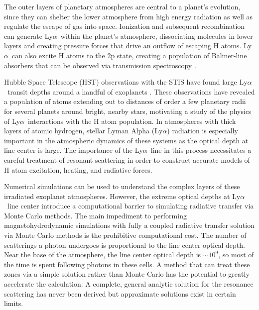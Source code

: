 \documentclass{aastex63}
\newcommand\lya{Ly$\alpha$\ }
\begin{document}
The outer layers of planetary atmospheres are central to a planet's evolution, since they can shelter the lower atmosphere from high energy radiation as well as regulate the escape of gas into space. Ionization and subsequent recombination can generate \lya within the planet's atmosphere, dissociating molecules in lower layers and creating pressure forces that drive an outflow of escaping H atoms. \lya can also excite H atoms to the 2p state, creating a population of Balmer-line absorbers that can be observed via transmission spectroscopy \citep{2017ApJ...851..150H}.

Hubble Space Telescope (HST) observations with the STIS have found large \lya transit depths around a handful of exoplanets \citep{2003Natur.422..143V, 2012A&A...543L...4L, 2012A&A...547A..18E, 2015Natur.522..459E,  2017A&A...597A..26B, 2017A&A...599L...3B, 2017A&A...602A.106B, 2018A&A...620A.147B, 2019AJ....158...50W, 2019EPSC...13.1928L, 2020ApJ...888L..21G,2021arXiv210309864B}. These observations have revealed a population of atoms extending out to distances of order a few planetary radii for several planets around bright, nearby stars, motivating a study of the physics of \lya interactions with the H atom population. In atmospheres with thick layers of atomic hydrogen, stellar Lyman Alpha (Ly$\alpha$) radiation is especially important in the atmospheric dynamics of these systems as the optical depth at line center is large. The importance of the \lya line in this process necessitates a careful treatment of resonant scattering in order to construct accurate models of H atom excitation, heating, and radiative forces. 

Numerical simulations can be used to understand the complex layers of these irradiated exoplanet atmospheres. However, the extreme optical depths at \lya line center introduce a computational barrier to simulating radiative transfer via Monte Carlo methods. The main impediment to performing magnetohydrodynamic simulations with fully a coupled radiative transfer solution via Monte Carlo methods is the prohibitive computational cost. The number of scatterings a photon undergoes is proportional to the line center optical depth.  Near the base of the atmosphere, the line center optical depth is ${\sim}10^9$, so most of the time is spent following photons in these cells. A method that can treat these zones via a simple solution rather than Monte Carlo has the potential to greatly accelerate the calculation. A complete, general analytic solution for the resonance scattering has never been derived but approximate solutions exist in certain limits.
\end{document}
